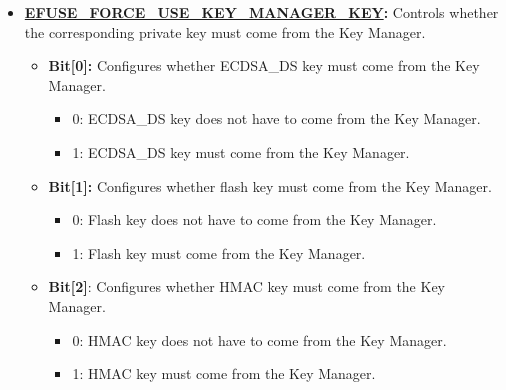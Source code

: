 \documentclass[main\_\_EN.tex]{subfiles}
\begin{document}
\begin{enumerate}
\begin{itemize}
\begin{itemize}
                \begin{itemize}
                    \item 0: ECDSA\_DS key can be deployed more than once.
                    \item 1: ECDSA\_DS key can be deployed only once.
                \end{itemize}
            \item \textbf{Bit[1]}: Configures whether XTS key can be deployed only once.
                \begin{itemize}
                    \item 0: XTS key can be deployed more than once.
                    \item 1: XTS key can be deployed only once.
                \end{itemize}
        \end{itemize}
        \item \textbf{\hyperref[fielddesc:EFUSEFORCEUSEKEYMANAGERKEY]{EFUSE\_FORCE\_USE\_KEY\_MANAGER\_KEY}:} Controls whether the corresponding private key must come from the Key Manager.
        \begin{itemize}
            \item \textbf{Bit[0]:} Configures whether ECDSA\_DS key must come from the Key Manager.
                \begin{itemize}
                    \item 0: ECDSA\_DS key does not have to come from the Key Manager.
                    \item 1: ECDSA\_DS key must come from the Key Manager.
                \end{itemize}
            \item \textbf{Bit[1]:} Configures whether flash key must come from the Key Manager.
                \begin{itemize}
                    \item 0: Flash key does not have to come from the Key Manager.
                    \item 1: Flash key must come from the Key Manager.
                \end{itemize}
            \item \textbf{Bit[2]}: Configures whether HMAC key must come from the Key Manager.
                \begin{itemize}
                    \item 0: HMAC key does not have to come from the Key Manager.
                    \item 1: HMAC key must come from the Key Manager.

\end{itemize}
\end{itemize}
\end{itemize}
\end{enumerate}
\end{document}
